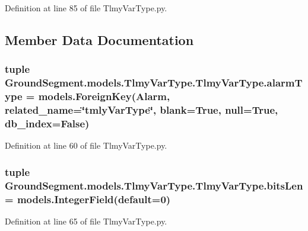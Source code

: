 Definition at line 85 of file Tlmy\+Var\+Type.\+py.



\subsection{Member Data Documentation}
\hypertarget{class_ground_segment_1_1models_1_1_tlmy_var_type_1_1_tlmy_var_type_accecfd4f317d7866b48ebec1e60f5766}{}
\subsubsection[{alarm\+Type}]{\setlength{\rightskip}{0pt plus 5cm}tuple Ground\+Segment.\+models.\+Tlmy\+Var\+Type.\+Tlmy\+Var\+Type.\+alarm\+Type = models.\+Foreign\+Key({\bf Alarm}, related\+\_\+name=\char`\"{}tmly\+Var\+Type\char`\"{}, blank=True, null=True, db\+\_\+index=False)\hspace{0.3cm}{\ttfamily [static]}}\label{class_ground_segment_1_1models_1_1_tlmy_var_type_1_1_tlmy_var_type_accecfd4f317d7866b48ebec1e60f5766}


Definition at line 60 of file Tlmy\+Var\+Type.\+py.

\hypertarget{class_ground_segment_1_1models_1_1_tlmy_var_type_1_1_tlmy_var_type_a539a59fecef80aaa8d292ac5312f252a}{}
\subsubsection[{bits\+Len}]{\setlength{\rightskip}{0pt plus 5cm}tuple Ground\+Segment.\+models.\+Tlmy\+Var\+Type.\+Tlmy\+Var\+Type.\+bits\+Len = models.\+Integer\+Field(default=0)\hspace{0.3cm}{\ttfamily [static]}}\label{class_ground_segment_1_1models_1_1_tlmy_var_type_1_1_tlmy_var_type_a539a59fecef80aaa8d292ac5312f252a}


Definition at line 65 of file Tlmy\+Var\+Type.\+py.

